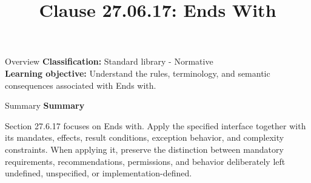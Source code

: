 \documentclass[10pt,letterpaper]{article}
\title{Clause 27.06.17: Ends With}
\author{}
\date{}
\begin{document}
\maketitle
\begin{CornellOverviewBox}{Overview}
\textbf{Classification:} Standard library - Normative\\[2pt]
\textbf{Learning objective:} Understand the rules, terminology, and semantic consequences associated with Ends with.
\end{CornellOverviewBox}\begin{CornellSummaryBox}{Summary}
{\sffamily\bfseries\color{Accent} Summary}\par\vspace{3pt}Section 27.6.17 focuses on Ends with. Apply the specified interface together with its mandates, effects, result conditions, exception behavior, and complexity constraints. When applying it, preserve the distinction between mandatory requirements, recommendations, permissions, and behavior deliberately left undefined, unspecified, or implementation-defined.
\end{CornellSummaryBox}
\end{document}
